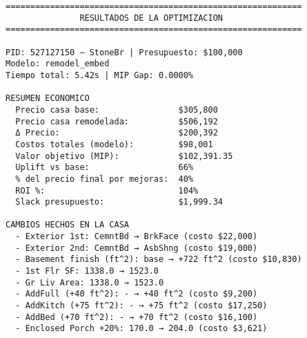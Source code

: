 

\begin{lstlisting}[caption={Salida del MIP. Notar que \textit{Gr Liv Area} y \textit{1st Floor SF} no llevan precio dircto, pues sus cambios están explicados por \textit{AddKitch}, \textit{AddBed} y \textit{AddFull}}]
============================================================
               RESULTADOS DE LA OPTIMIZACION
============================================================

PID: 527127150 – StoneBr | Presupuesto: $100,000
Modelo: remodel_embed
Tiempo total: 5.42s | MIP Gap: 0.0000%

RESUMEN ECONOMICO
  Precio casa base:                $305,800
  Precio casa remodelada:          $506,192
  Δ Precio:                        $200,392
  Costos totales (modelo):         $98,001
  Valor objetivo (MIP):            $102,391.35   
  Uplift vs base:                  66%
  % del precio final por mejoras:  40%
  ROI %:                           104%
  Slack presupuesto:               $1,999.34

CAMBIOS HECHOS EN LA CASA
  - Exterior 1st: CemntBd → BrkFace (costo $22,000)
  - Exterior 2nd: CemntBd → AsbShng (costo $19,000)
  - Basement finish (ft^2): base → +722 ft^2 (costo $10,830)
  - 1st Flr SF: 1338.0 → 1523.0
  - Gr Liv Area: 1338.0 → 1523.0
  - AddFull (+40 ft^2): - → +40 ft^2 (costo $9,200)
  - AddKitch (+75 ft^2): - → +75 ft^2 (costo $17,250)
  - AddBed (+70 ft^2): - → +70 ft^2 (costo $16,100)
  - Enclosed Porch +20%: 170.0 → 204.0 (costo $3,621)


\end{lstlisting}
